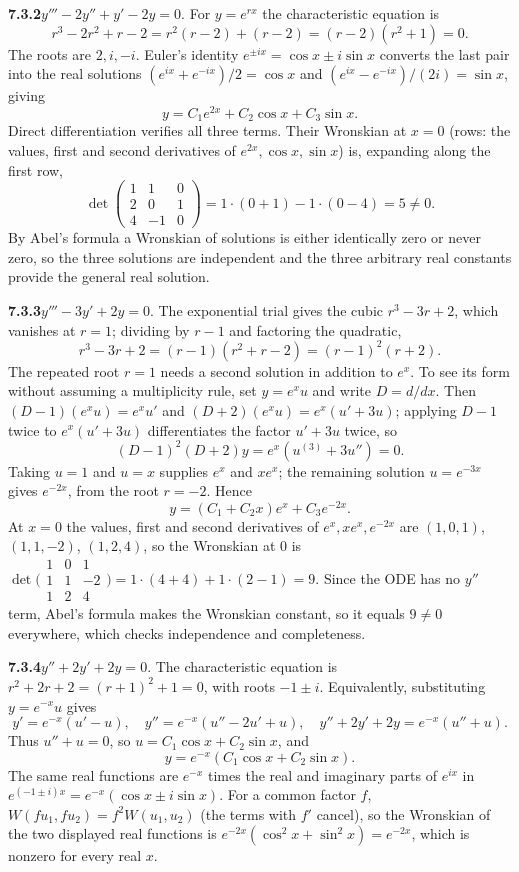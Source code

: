 \par\bigskip
\noindent\textbf{7.3.2}\quad $y'''-2y''+y'-2y=0$.
\solution
For $y=e^{rx}$ the characteristic equation is
\[
r^3-2r^2+r-2=r^2(r-2)+(r-2)=(r-2)(r^2+1)=0.
\]
The roots are $2,i,-i$. Euler's identity $e^{\pm ix}=\cos x\pm i\sin x$
converts the last pair into the real solutions
$(e^{ix}+e^{-ix})/2=\cos x$ and $(e^{ix}-e^{-ix})/(2i)=\sin x$, giving
\[
\boxed{y=C_1e^{2x}+C_2\cos x+C_3\sin x}.
\]
Direct differentiation verifies all three terms. Their Wronskian at
$x=0$ (rows: the values, first and second derivatives of
$e^{2x},\cos x,\sin x$) is, expanding along the first row,
\[
\det\begin{pmatrix}1&1&0\\2&0&1\\4&-1&0\end{pmatrix}
=1\cdot(0+1)-1\cdot(0-4)=5\ne0.
\]
By Abel's formula a Wronskian of solutions is either identically zero or
never zero, so the three solutions are independent and the three arbitrary
real constants provide the general real solution.

\par\bigskip
\noindent\textbf{7.3.3}\quad $y'''-3y'+2y=0$.
\solution
The exponential trial gives the cubic $r^3-3r+2$, which vanishes at
$r=1$; dividing by $r-1$ and factoring the quadratic,
\[
r^3-3r+2=(r-1)(r^2+r-2)=(r-1)^2(r+2).
\]
The repeated root $r=1$ needs a second solution in addition to $e^x$.
To see its form without assuming a multiplicity rule, set $y=e^xu$ and
write $D=d/dx$. Then $(D-1)(e^xu)=e^xu'$ and
$(D+2)(e^xu)=e^x(u'+3u)$; applying $D-1$ twice to $e^x(u'+3u)$
differentiates the factor $u'+3u$ twice, so
\[
(D-1)^2(D+2)y=e^x(u^{(3)}+3u'')=0.
\]
Taking $u=1$ and $u=x$ supplies $e^x$ and $xe^x$; the remaining solution
$u=e^{-3x}$ gives $e^{-2x}$, from the root $r=-2$. Hence
\[
\boxed{y=(C_1+C_2x)e^x+C_3e^{-2x}}.
\]
At $x=0$ the values, first and second derivatives of
$e^x,xe^x,e^{-2x}$ are $(1,0,1)$, $(1,1,-2)$, $(1,2,4)$, so the
Wronskian at $0$ is
$\det\bigl(\begin{smallmatrix}1&0&1\\1&1&-2\\1&2&4\end{smallmatrix}\bigr)
=1\cdot(4+4)+1\cdot(2-1)=9$.
Since the ODE has no $y''$ term, Abel's formula makes the Wronskian
constant, so it equals $9\ne0$ everywhere, which checks independence and
completeness.

\par\bigskip
\noindent\textbf{7.3.4}\quad $y''+2y'+2y=0$.
\solution
The characteristic equation is
$r^2+2r+2=(r+1)^2+1=0$, with roots $-1\pm i$.
Equivalently, substituting $y=e^{-x}u$ gives
\[
y'=e^{-x}(u'-u),\quad y''=e^{-x}(u''-2u'+u),\quad
 y''+2y'+2y=e^{-x}(u''+u).
\]
Thus $u''+u=0$, so $u=C_1\cos x+C_2\sin x$, and
\[
\boxed{y=e^{-x}(C_1\cos x+C_2\sin x)}.
\]
The same real functions are $e^{-x}$ times the real and imaginary parts
of $e^{ix}$ in $e^{(-1\pm i)x}=e^{-x}(\cos x\pm i\sin x)$.
For a common factor $f$, $W(fu_1,fu_2)=f^2W(u_1,u_2)$ (the terms with
$f'$ cancel), so the Wronskian of the two displayed real functions is
$e^{-2x}(\cos^2x+\sin^2x)=e^{-2x}$, which is nonzero for every real $x$.

